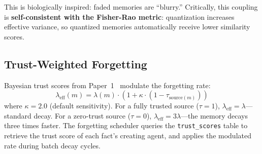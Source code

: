 This is biologically inspired: faded memories are ``blurry.'' Critically, this coupling is \textbf{self-consistent with the Fisher-Rao metric}: quantization increases effective variance, so quantized memories automatically receive lower similarity scores.

\subsection{Trust-Weighted Forgetting}

Bayesian trust scores from Paper~1~\cite{slm-paper1} modulate the forgetting rate:
\begin{equation}
\lambda_{\text{eff}}(m) = \lambda(m) \cdot (1 + \kappa \cdot (1 - \tau_{\text{source}(m)}))
\end{equation}
where $\kappa = 2.0$ (default sensitivity). For a fully trusted source ($\tau = 1$), $\lambda_{\text{eff}} = \lambda$---standard decay. For a zero-trust source ($\tau = 0$), $\lambda_{\text{eff}} = 3\lambda$---the memory decays three times faster. The forgetting scheduler queries the \texttt{trust\_scores} table to retrieve the trust score of each fact's creating agent, and applies the modulated rate during batch decay cycles.

